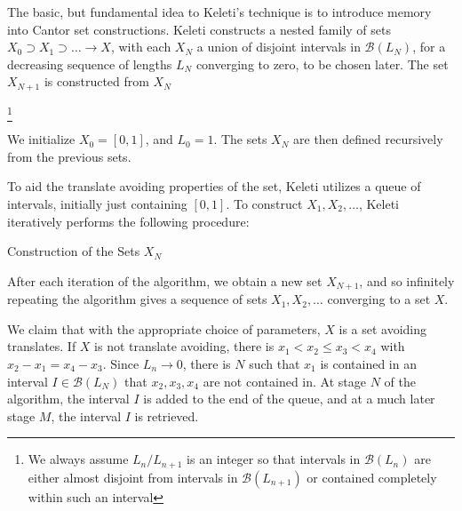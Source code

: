 \documentclass{report}
\theoremstyle{plain}
\theoremstyle{plain}
\begin{document}
The basic, but fundamental idea to Keleti's technique is to introduce memory into Cantor set constructions. Keleti constructs a nested family of sets $X_0 \supset X_1 \supset \dots \to X$, with each $X_N$ a union of disjoint intervals in $\mathcal{B}(L_N)$, for a decreasing sequence of lengths $L_N$ converging to zero, to be chosen later. The set $X_{N+1}$ is constructed from $X_N$ 

\footnote{We always assume $L_n/L_{n+1}$ is an integer so that intervals in $\mathcal{B}(L_n)$ are either almost disjoint from intervals in $\mathcal{B}(L_{n+1})$ or contained completely within such an interval}

We initialize $X_0 = [0,1]$, and $L_0 = 1$. The sets $X_N$ are then defined recursively from the previous sets.

To aid the translate avoiding properties of the set, Keleti utilizes a queue of intervals, initially just containing $[0,1]$. To construct $X_1, X_2, \dots$, Keleti iteratively performs the following procedure:
%
\begin{algorithm}
    \begin{algorithmic}%
        \caption{Construction of the Sets $X_N$}
        \MRepeat


            \EndForAll
        \EndRepeat   
    \end{algorithmic}
\end{algorithm}
%
After each iteration of the algorithm, we obtain a new set $X_{N+1}$, and so infinitely repeating the algorithm gives a sequence of sets $X_1, X_2, \dots$ converging to a set $X$.

We claim that with the appropriate choice of parameters, $X$ is a set avoiding translates. If $X$ is not translate avoiding, there is $x_1 < x_2 \leq x_3 < x_4$ with $x_2 - x_1 = x_4 - x_3$. Since $L_n \to 0$, there is $N$ such that $x_1$ is contained in an interval $I \in \mathcal{B}(L_N)$ that $x_2,x_3, x_4$ are not contained in. At stage $N$ of the algorithm, the interval $I$ is added to the end of the queue, and at a much later stage $M$, the interval $I$ is retrieved.
\end{document}
